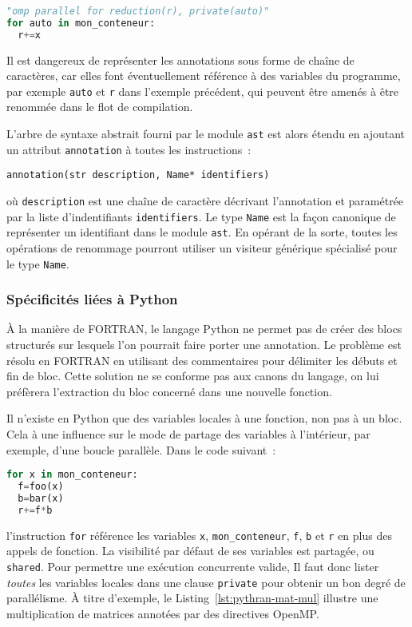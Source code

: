 \documentclass[renpar]{compas2013}
\begin{document}
\begin{lstlisting}[language=python]
"omp parallel for reduction(r), private(auto)"
for auto in mon_conteneur:
  r+=x
\end{lstlisting}

Il est dangereux de représenter les annotations sous forme de chaîne de
caractères, car elles font éventuellement référence à des variables du
programme, par exemple \texttt{auto} et \texttt{r} dans l'exemple précédent, qui peuvent
être amenés à être renommée dans le flot de compilation.

L'arbre de syntaxe abstrait fourni par le module \texttt{ast} est alors
étendu en ajoutant un attribut \texttt{annotation} à toutes les
instructions~:

\begin{lstlisting}
annotation(str description, Name* identifiers)
\end{lstlisting}

\noindent où \texttt{description} est une chaîne de caractère décrivant
l'annotation et paramétrée par la liste d'indentifiants
\texttt{identifiers}. Le type \texttt{Name} est la façon canonique de
représenter un identifiant dans le module \texttt{ast}.  En opérant de la
sorte, toutes les opérations de renommage pourront utiliser un visiteur
générique spécialisé pour le type \texttt{Name}.

\subsubsection{Spécificités liées à Python}

À la manière de FORTRAN, le langage Python ne permet pas de créer des
blocs structurés sur lesquels l'on pourrait faire porter une annotation.
Le problème est résolu en FORTRAN en utilisant des commentaires pour
délimiter les débuts et fin de bloc. Cette solution ne se conforme pas aux
canons du langage, on lui préfèrera l'extraction du bloc concerné dans une
nouvelle fonction.

Il n'existe en Python que des variables locales à une fonction, non pas à
un bloc. Cela à une influence sur le mode de partage des variables à
l'intérieur, par exemple, d'une boucle parallèle. Dans le code suivant~:

\begin{lstlisting}[language=python]
for x in mon_conteneur:
  f=foo(x)
  b=bar(x)
  r+=f*b
\end{lstlisting}

\noindent l'instruction \texttt{for} référence les variables \texttt{x},
\texttt{mon\_conteneur}, \texttt{f}, \texttt{b} et \texttt{r} en plus des
appels de fonction. La visibilité par défaut de ses variables est
partagée, ou \texttt{shared}. Pour permettre une exécution concurrente
valide, Il faut donc lister \emph{toutes} les variables locales
dans une clause \texttt{private} pour obtenir un bon degré de
parallélisme.  À titre d'exemple, le Listing~\ref{lst:pythran-mat-mul}
illustre une multiplication de matrices annotées par des directives
OpenMP.
\end{document}
